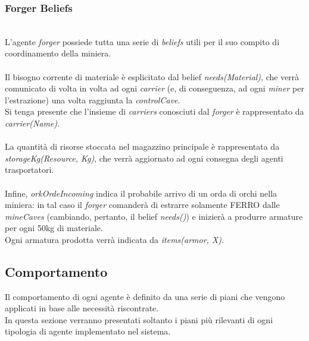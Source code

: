 \documentclass{llncs}
\begin{document}
\subsubsection{Forger Beliefs}~
\\
L'agente \textit{forger} possiede tutta una serie di \textit{beliefs} utili per il suo compito di coordinamento della miniera.\\\\
Il bisogno corrente di materiale è esplicitato dal belief \textit{needs(Material)}, che verrà comunicato di volta in volta ad ogni \textit{carrier} (e, di conseguenza, ad ogni \textit{miner} per l'estrazione) una volta raggiunta la \textit{controlCave}.\\Si tenga presente che l'insieme di \textit{carriers} conosciuti dal \textit{forger} è rappresentato da \textit{carrier(Name)}.\\\\La quantità di risorse stoccata nel magazzino principale è rappresentata da \textit{storageKg(Resource, Kg)}, che verrà aggiornato ad ogni consegna degli agenti trasportatori.\\\\
Infine, \textit{orkOrdeIncoming} indica il probabile arrivo di un orda di orchi nella miniera: in tal caso il \textit{forger} comanderà di estrarre solamente FERRO dalle \textit{mineCaves} (cambiando, pertanto, il belief \textit{needs()}) e inizierà a produrre armature per ogni 50kg di materiale.\\
Ogni armatura prodotta verrà indicata da \textit{items(armor, X)}.
\newpage
\subsection{Comportamento}
Il comportamento di ogni agente è definito da una serie di piani che vengono applicati in base alle necessità riscontrate.\\
In questa sezione verranno presentati soltanto i piani più rilevanti di ogni tipologia di agente implementato nel sistema.
\end{document}
